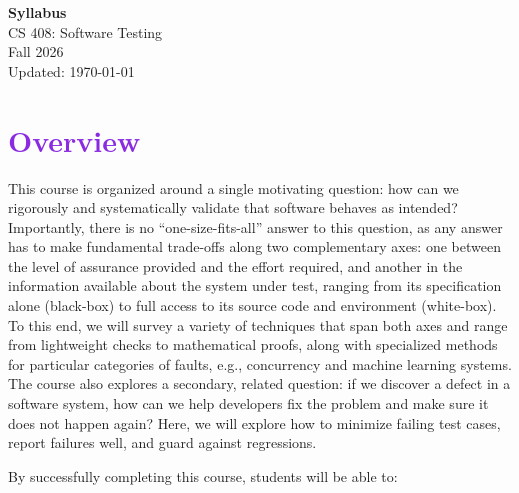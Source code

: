 \documentclass[letterpaper,11pt]{article}
\begin{document}
\begin{center}
	{\LARGE{\textbf{Syllabus}}}\\
	  \vspace*{10pt}
	{\Large{CS 408: Software Testing}}\\
        \vspace*{5pt}
	{\Large{Fall 2026}}\\
        \vspace*{5pt}
        Updated: \today \\

  \vspace*{10pt}
\end{center}

\section*{\textcolor{BlueViolet}{Overview}}

This course is organized around a single motivating question: how can
we rigorously and systematically validate that software behaves as
intended? Importantly, there is no ``one-size-fits-all'' answer to
this question, as any answer has to make fundamental trade-offs along
two complementary axes: one between the level of assurance provided
and the effort required, and another in the information available
about the system under test, ranging from its specification alone
(black-box) to full access to its source code and environment
(white-box). To this end, we will survey a variety of techniques that
span both axes and range from lightweight checks to mathematical
proofs, along with specialized methods for particular categories of
faults, e.g., concurrency and machine learning systems. The course
also explores a secondary, related question: if we discover a defect
in a software system, how can we help developers fix the problem and
make sure it does not happen again? Here, we will explore how to
minimize failing test cases, report failures well, and guard against
regressions.

By successfully completing this course, students will be able to:
\end{document}
